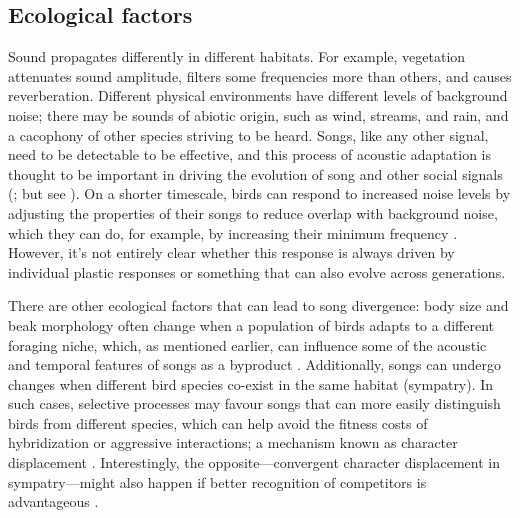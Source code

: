 \subsection{Ecological factors }
Sound propagates differently in different habitats. For example, vegetation attenuates sound amplitude, filters some frequencies more than others, and causes reverberation. Different physical environments have different levels of background noise; there may be sounds of abiotic origin, such as wind, streams, and rain, and a cacophony of other species striving to be heard. Songs, like any other signal, need to be detectable to be effective, and this process of acoustic adaptation is thought to be important in driving the evolution of song and other social signals (\cite{Endler1992,Grant2010,Tobias2010}; but see \cite{mikula2020}). On a shorter timescale, birds can respond to increased noise levels by adjusting the properties of their songs to reduce overlap with background noise, which they can do, for example, by increasing their minimum frequency \autocite{winandy2021, liu2020, derryberry2020, roca2016, nemeth2013, halfwerk2011, brumm2004}. However, it's not entirely clear whether this response is always driven by individual plastic responses or something that can also evolve across generations.

There are other ecological factors that can lead to song divergence: body size and beak morphology often change when a population of birds adapts to a different foraging niche, which, as mentioned earlier, can influence some of the acoustic and temporal features of songs as a byproduct \autocite{mayr1963,podos2001}. Additionally, songs can undergo changes when different bird species co-exist in the same habitat (sympatry). In such cases, selective processes may favour songs that can more easily distinguish birds from different species, which can help avoid the fitness costs of hybridization or aggressive interactions; a mechanism known as character displacement \autocite{seddon2005}. Interestingly, the opposite---convergent character displacement in sympatry---might also happen if better recognition of competitors is advantageous \autocite{grant1972, Tobias2014, Tobias2009}. 


